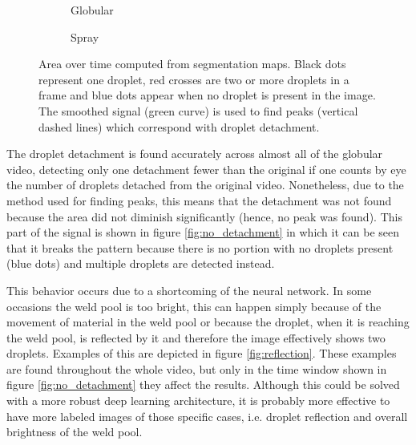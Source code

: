 \begin{figure}
  \begin{subfigure}[b]{\textwidth}
    
    \caption{Globular}
    \label{fig:globular_areas}
  \end{subfigure}
\vfill
  \begin{subfigure}[b]{\textwidth}
    
    \caption{Spray}
    \label{fig:spray_areas}
  \end{subfigure}
  \caption[Area over time computed from segmentation maps]{Area over time computed from segmentation maps. Black dots represent one droplet, red crosses are two or more droplets in a frame and blue dots appear when no droplet is present in the image. The smoothed signal (green curve) is used to find peaks (vertical dashed lines) which correspond with droplet detachment.} 
\end{figure}

The droplet detachment is found accurately across almost all of the globular video, detecting only one detachment fewer than the original if one counts by eye the number of droplets detached from the original video. Nonetheless, due to the method used for finding peaks, this means that the detachment was not found because the area did not diminish significantly (hence, no peak was found). This part of the signal is shown in figure \ref{fig:no_detachment} in which it can be seen that it breaks the pattern because there is no portion with no droplets present (blue dots) and multiple droplets are detected instead.

This behavior occurs due to a shortcoming of the neural network. In some occasions the weld pool is too bright, this can happen simply because of the movement of material in the weld pool or because the droplet, when it is reaching the weld pool, is reflected by it and therefore the image effectively shows two droplets. Examples of this are depicted in figure \ref{fig:reflection}. These examples are found throughout the whole video, but only in the time window shown in figure \ref{fig:no_detachment} they affect the results. Although this could be solved with a more robust deep learning architecture, it is probably more effective to have more labeled images of those specific cases, i.e. droplet reflection and overall brightness of the weld pool.

